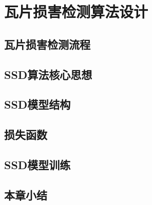 \section{瓦片损害检测算法设计}
\setcounter{figure}{0}

\subsection{瓦片损害检测流程}

\subsection{SSD算法核心思想}

\subsection{SSD模型结构}

\subsection{损失函数}

\subsection{SSD模型训练}

\subsection{本章小结}
